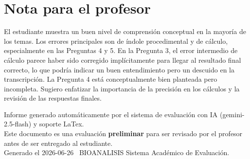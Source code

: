 \documentclass[11pt,a4paper]{article}
\begin{document}
\section*{Nota para el profesor}
\begin{tcolorbox}[
  enhanced, breakable,
  colback=yellow!8, colframe=yellow!60!black,
  fonttitle=\bfseries, coltitle=black,
  title={Observaciones para revisión manual},
  top=4pt, bottom=4pt, left=8pt, right=8pt,
]
El estudiante muestra un buen nivel de comprensión conceptual en la mayoría de los temas. Los errores principales son de índole procedimental y de cálculo, especialmente en las Preguntas 4 y 5. En la Pregunta 3, el error intermedio de cálculo parece haber sido corregido implícitamente para llegar al resultado final correcto, lo que podría indicar un buen entendimiento pero un descuido en la transcripción. La Pregunta 4 está conceptualmente bien planteada pero incompleta. Sugiero enfatizar la importancia de la precisión en los cálculos y la revisión de las respuestas finales.
\end{tcolorbox}

\vspace{12pt}
\begin{center}
  \footnotesize\color{gray}
  Informe generado automáticamente por el sistema de evaluación con IA (gemini-2.5-flash) y soporte LaTex. \\
  Este documento es una evaluación \textbf{preliminar} para ser revisado por el profesor antes de ser entregado al 
  estudiante. \\
  Generado el 2026-06-26 \textbullet\ BIOANALISIS Sistema Académico de Evaluación.
  \end{center}
\end{document}
